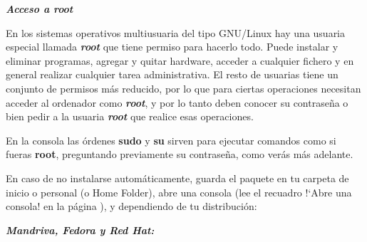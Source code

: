 \bigskip


\bigskip


\bigskip


\bigskip


\bigskip


\bigskip


\bigskip



\begin{center}
\begin{minipage}{16.919cm}
{\centering\bfseries\itshape
\label{ref:accesoroot}Acceso a root
\par}

En los sistemas operativos multiusuaria del tipo GNU/Linux hay una
usuaria especial llamada \textbf{\textit{root}} que tiene permiso para
hacerlo todo. Puede instalar y eliminar programas, agregar y quitar
hardware, acceder a cualquier fichero y en general realizar cualquier
tarea administrativa. El resto de usuarias tiene un conjunto de
permisos más reducido, por lo que para ciertas operaciones necesitan
acceder al ordenador como \textbf{\textit{root}}, y por lo tanto deben
conocer su contraseña o bien pedir a la usuaria
\textbf{\textit{root}} que realice esas operaciones.

En la consola las órdenes \textbf{sudo} y \textbf{su} sirven para
ejecutar comandos como si fueras \textbf{root}, preguntando previamente
su contraseña, como verás más adelante.
\end{minipage}
\end{center}
En caso de no instalarse automáticamente, guarda el paquete en tu
carpeta de inicio o personal (o {\textquotesingle}Home
Folder{\textquotesingle}), abre una consola (lee el recuadro !`Abre una
consola! en la página \pageref{ref:abreunaconsola}), y dependiendo de
tu distribución:

{\bfseries\itshape
Mandriva, Fedora y Red Hat:}



\begin{center}
\begin{minipage}{16.48cm}


\textstyleUserEntry{
\ \ }


\end{minipage}
\end{center}

